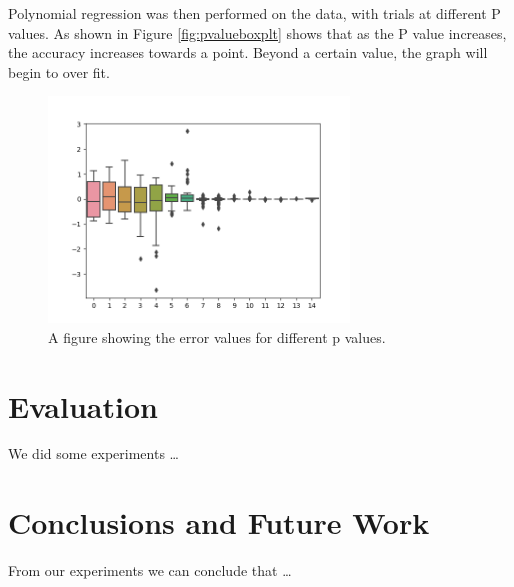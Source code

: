 \documentclass[a4paper, 11pt]{article}
\begin{document}
Polynomial regression was then performed on the data, with trials at different P values. As shown in Figure \ref{fig:pvalueboxplt} shows that as the P value increases, the accuracy increases towards a point. Beyond a certain value, the graph will begin to over fit.

\begin{figure}[h]
    \includegraphics[width=8cm]{fig/pvalueboxplot.png}
    \caption{A figure showing the error values for different p values.}
    \label{fig:traintestsplit}
\end{figure}

\pagebreak

\section{Evaluation}

We did some experiments \ldots

\pagebreak

\section{Conclusions and Future Work}

From our experiments we can conclude that \ldots


\end{document}
